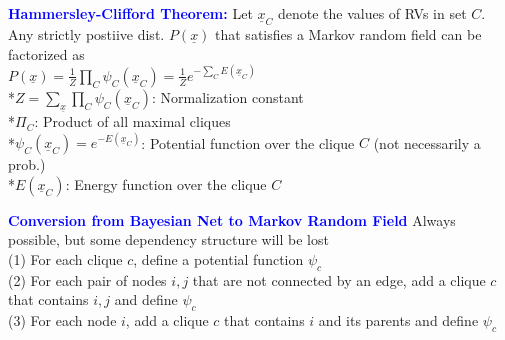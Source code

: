 \documentclass[5pt]{extarticle} %
\begin{document}
\begin{paracol}{3}
{    \textcolor{blue}{\textbf{Hammersley-Clifford Theorem:}} Let $\underline{x}_C$ denote the values of RVs in set $C$. Any strictly postiive dist. $P(\underline{x})$ that satisfies a Markov random field can be factorized as \\
    $P(\underline{x}) = \frac{1}{Z} \prod_{C} \psi_C(\underline{x}_C) = \frac{1}{Z} e^{-\sum_C E(\underline{x}_C)}$ \\
    *$Z= \sum_{\underline{x}} \prod_C \psi_C (\underline{x}_C)$: Normalization constant \\
    *$\Pi_C$: Product of all maximal cliques \\
    *$\psi_C(\underline{x}_C) = e^{-E(\underline{x}_C)}$: Potential function over the clique $C$ (not necessarily a prob.) \\
    *$E(\underline{x}_C)$: Energy function over the clique $C$ 

    \textcolor{blue}{\textbf{Conversion from Bayesian Net to Markov Random Field}} Always possible, but some dependency structure will be lost \\
    (1) For each clique $c$, define a potential function $\psi_c$ \\
    (2) For each pair of nodes $i,j$ that are not connected by an edge, add a clique $c$ that contains $i,j$ and define $\psi_c$ \\
    (3) For each node $i$, add a clique $c$ that contains $i$ and its parents and define $\psi_c$


    



    }
\end{paracol}
\end{document}
